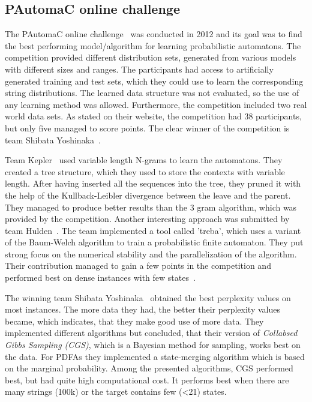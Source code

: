 \documentclass[
a4paper,
12pt
]{scrartcl}
\begin{document}
\subsection{PAutomaC online challenge}
The PAutomaC online challenge~\cite{Verwer.2014} was conducted in 2012 and its goal was to find the best performing model/algorithm for learning probabilistic automatons. The competition provided different distribution sets, generated from various models with different sizes and ranges. The participants had access to artificially generated training and test sets, which they could use to learn the corresponding string distributions. The learned data structure was not evaluated, so the use of any learning method was allowed. Furthermore, the competition included two real world data sets. As stated on their website, the competition had 38 participants, but only five managed to score points. The clear winner of the competition is team Shibata Yoshinaka~\cite{Shibata_the11th}.

Team Kepler~\cite{Kepler} used variable length N-grams to learn the automatons. They created a tree structure, which they used to store the contexts with variable length. After having inserted all the sequences into the tree, they pruned it with the help of the Kullback-Leibler divergence between the leave and the parent. They managed to produce better results than the 3 gram algorithm, which was provided by the competition.
Another interesting approach was submitted by team Hulden~\cite{MansHulden.2012}. The team implemented a tool called 'treba', which uses a variant of the Baum-Welch algorithm to train a probabilistic finite automaton. They put strong focus on the numerical stability and the parallelization of the algorithm. Their contribution managed to gain a few points in the competition and performed best on dense instances with few states~\cite{Verwer.2014}.

The winning team Shibata Yoshinaka~\cite{Shibata_the11th} obtained the best perplexity values on most instances. The more data they had, the better their perplexity values became, which indicates, that they make good use of more data. They implemented different algorithms but concluded, that their version of \textit{Collabsed Gibbs Sampling (CGS)}, which is a Bayesian method for sampling, works best on the data. For PDFAs they implemented a state-merging algorithm which is based on the marginal probability. Among the presented algorithms, CGS performed best, but had quite high computational cost. It performs best when there are many strings (100k) or the target contains few (<21) states.
\end{document}
